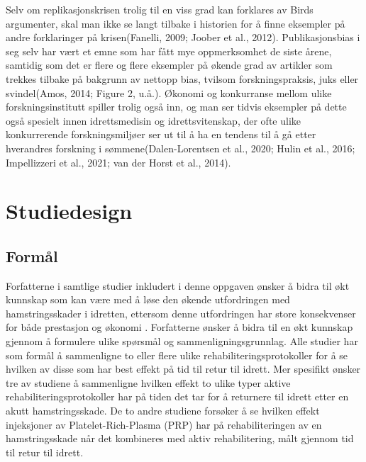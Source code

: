 \documentclass[
]{book}
\begin{document}
Selv om replikasjonskrisen trolig til en viss grad kan forklares av Birds argumenter, skal man ikke se langt tilbake i historien for å finne eksempler på andre forklaringer på krisen(Fanelli, 2009; Joober et al., 2012). Publikasjonsbias i seg selv har vært et emne som har fått mye oppmerksomhet de siste årene, samtidig som det er flere og flere eksempler på økende grad av artikler som trekkes tilbake på bakgrunn av nettopp bias, tvilsom forskningspraksis, juks eller svindel(Amos, 2014; Figure 2, u.å.). Økonomi og konkurranse mellom ulike forskningsinstitutt spiller trolig også inn, og man ser tidvis eksempler på dette også spesielt innen idrettsmedisin og idrettsvitenskap, der ofte ulike konkurrerende forskningsmiljøer ser ut til å ha en tendens til å gå etter hverandres forskning i sømmene(Dalen-Lorentsen et al., 2020; Hulin et al., 2016; Impellizzeri et al., 2021; van der Horst et al., 2014).

\hypertarget{studiedesign}{%
\chapter{Studiedesign}\label{studiedesign}}

\hypertarget{formuxe5l}{%
\section{Formål}\label{formuxe5l}}

Forfatterne i samtlige studier inkludert i denne oppgaven ønsker å bidra til økt kunnskap som kan være med å løse den økende utfordringen med hamstringsskader i idretten, ettersom denne utfordringen har store konsekvenser for både prestasjon og økonomi \citep{ekstrand2011, hickey2014, eirale2013, hickey2020, askling2014, hamilton2015, ahamid2014, askling2013}. Forfatterne ønsker å bidra til en økt kunnskap gjennom å formulere ulike spørsmål og sammenligningsgrunnlag. Alle studier har som formål å sammenligne to eller flere ulike rehabiliteringsprotokoller for å se hvilken av disse som har best effekt på tid til retur til idrett. Mer spesifikt ønsker tre av studiene å sammenligne hvilken effekt to ulike typer aktive rehabiliteringsprotokoller har på tiden det tar for å returnere til idrett etter en akutt hamstringsskade\citep[\citet{askling2013}, \citet{hickey2020}]{askling2014}. De to andre studiene forsøker å se hvilken effekt injeksjoner av Platelet-Rich-Plasma (PRP) har på rehabiliteringen av en hamstringsskade når det kombineres med aktiv rehabilitering, målt gjennom tid til retur til idrett\citep{ahamid2014, hamilton2015}.
\end{document}

